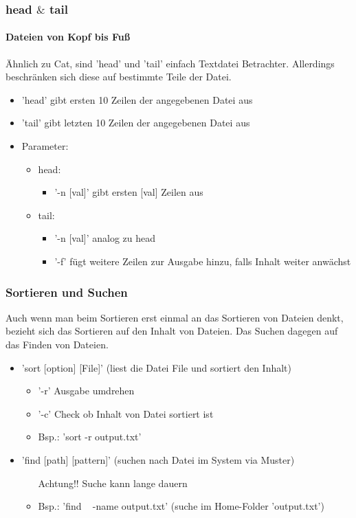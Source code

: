 \documentclass[12pt,utf8]{beamer}
\begin{document}
\begin{frame}
\frametitle{head $\&$ tail}
\framesubtitle{Dateien von Kopf bis Fuß}
Ähnlich zu Cat, sind 'head' und 'tail' einfach Textdatei Betrachter. Allerdings beschränken sich diese auf bestimmte Teile der Datei.
\begin{itemize}
	\item 'head' gibt ersten 10 Zeilen der angegebenen Datei aus
	\item 'tail' gibt letzten 10 Zeilen der angegebenen Datei aus
	\item Parameter:
	\begin{itemize}
		\item head:
		\begin{itemize}[<+->]
			\item '-n [val]' gibt ersten [val] Zeilen aus 
		\end{itemize}
		\item tail:
		\begin{itemize}[<+->]
			\item '-n [val]' analog zu head
			\item '-f' fügt weitere Zeilen zur Ausgabe hinzu, falls Inhalt weiter anwächst
		\end{itemize}
	\end{itemize}
\end{itemize}
\end{frame}

\begin{frame}
\frametitle{Sortieren und Suchen}
Auch wenn man beim Sortieren erst einmal an das Sortieren von Dateien denkt,
bezieht sich das Sortieren auf den Inhalt von Dateien.
Das Suchen dagegen auf das Finden von Dateien.
\begin{itemize}[<+->]
	\item 'sort [option] [File]' (liest die Datei File und sortiert den Inhalt)
	\begin{itemize}[<+->]
		\item '-r' Ausgabe umdrehen
		\item '-c' Check ob Inhalt von Datei sortiert ist
		\item Bsp.: 'sort -r output.txt'
	\end{itemize}
	\item 'find [path] [pattern]' (suchen nach Datei im System via Muster)
	\begin{itemize}[<+->]
		\item [Achtung!!] Suche kann lange dauern
		\item Bsp.: 'find ~ -name output.txt' (suche im Home-Folder 'output.txt')
	\end{itemize}
\end{itemize}
\end{frame}
\end{document}
